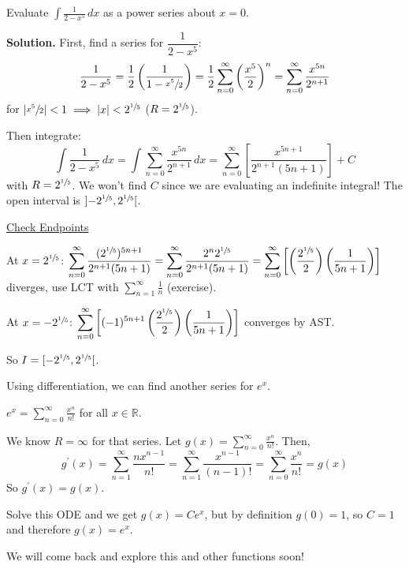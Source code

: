 \begin{Example}{}{}
    Evaluate $ \displaystyle \int \frac{1}{2-x^5} \, d{x}  $
    as a power series about $ x=0 $.

    \textbf{Solution.} First, find a series for $ \dfrac{1}{2-x^5} $:
    \[ \frac{1}{2-x^5}
        =\frac{1}{2} \left( \frac{1}{1-\sfrac{x^5}{2}} \right)
        =\frac{1}{2} \sum\limits_{n=0}^{\infty} \left( \frac{x^5}{2}  \right)^n
        =\sum\limits_{n=0}^{\infty} \frac{x^{5n}}{2^{n+1}}  \]
    for $ \abs*{\sfrac{x^5}{2} }<1\implies \abs{x}<2^{\sfrac{1}{5}} $ ($ R=2^{\sfrac{1}{5}} $).

    Then integrate:
    \[ \int \frac{1}{2-x^5} \, d{x} =
        \int \sum\limits_{n=0}^{\infty} \frac{x^{5n}}{2^{n+1}} \, d{x}
        =\sum\limits_{n=0}^{\infty} \left[ \frac{x^{5n+1}}{2^{n+1}(5n+1)}  \right]+C \]
    with $ R=2^{\sfrac{1}{5}} $. We won't find $ C $ since we are evaluating an
    indefinite integral! The open interval is $ \interval[open]{-2^{\sfrac{1}{5}}}{2^{\sfrac{1}{5}  }} $.

    \underline{Check Endpoints}

    At $ x=2^{\sfrac{1}{5}} $: $ \displaystyle \sum\limits_{n=0}^{\infty}
        \frac{(2^{\sfrac{1}{5}})^{5n+1}}{2^{n+1}(5n+1)}=
        \sum\limits_{n=0}^{\infty} \frac{2^n 2^{\sfrac{1}{5}}}{2^{n+1}(5n+1)}
        =\sum\limits_{n=0}^{\infty} \left[ \left( \frac{2^{\sfrac{1}{5} }}{2} \right)
            \left( \frac{1}{5n+1} \right) \right]  $ diverges,
    use LCT with $ \sum\limits_{n=1}^{\infty} \frac{1}{n} $ (exercise).

    At $ x=-2^{\sfrac{1}{5} } $:
    $ \displaystyle \sum\limits_{n=0}^{\infty}
        \left[(-1)^{5n+1}\left( \frac{2^{\sfrac{1}{5} }}{2}  \right)
            \left( \frac{1}{5n+1}  \right)\right] $ converges by AST\@.

    So $ I=\interval[open right]{-2^{\sfrac{1}{5} }}{2^{\sfrac{1}{5}}} $.
\end{Example}

Using differentiation, we can find another series for $ e^x $.

\begin{Proposition}{}{}
    $ \displaystyle e^x=\sum\limits_{n=0}^{\infty} \frac{x^n}{n!} $
    for all $ x\in\mathbb{R} $.
\end{Proposition}

\begin{Proof}{}{}
    We know $ R=\infty $ for that series. Let $ g(x)=\displaystyle \sum\limits_{n=0}^{\infty}
        \frac{x^n}{n!} $. Then,
    \[ g^\prime(x)=\sum\limits_{n=1}^{\infty} \frac{n x^{n-1}}{n!}
        =\sum\limits_{n=1}^{\infty} \frac{x^{n-1}}{(n-1)!}
        =\sum\limits_{n=0}^{\infty} \frac{x^n}{n!}=g(x) \]
    So $ g^\prime(x)=g(x) $.

    Solve this ODE and we get $ g(x)=Ce^x $, but by definition $ g(0)=1 $,
    so $ C=1 $ and therefore $ g(x)=e^x $.
\end{Proof}

We will come back and explore this and other functions soon!
